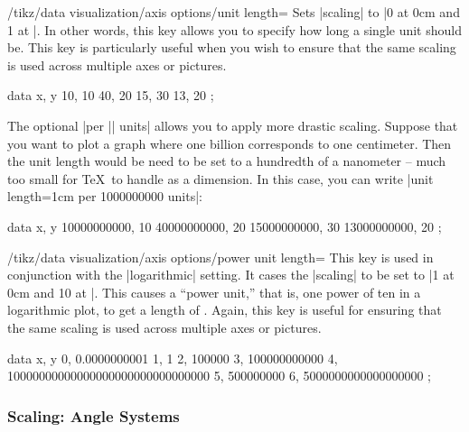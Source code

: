 \begin{key}{/tikz/data visualization/axis
    options/unit length=}
  Sets |scaling| to |0 at 0cm and 1 at |. In other
  words, this key allows you to specify how long a single unit should
  be. This key is particularly useful when you wish to ensure that the
  same scaling is used across multiple axes or pictures.  
\begin{codeexample}[]
\tikz \datavisualization [scientific axes,
                          all axes={ticks=few, unit length=1mm},
                          visualize as line]
    data {
      x, y
      10, 10
      40, 20
      15, 30
      13, 20
    };
\end{codeexample}
  The optional |per || units| allows you to apply more
  drastic scaling. Suppose that you want to plot a graph where one
  billion corresponds to one centimeter. Then the unit length would be
  need to be set to a hundredth of a nanometer -- much too small for
  \TeX\ to handle as a dimension. In this case, you can write
  |unit length=1cm per 1000000000 units|:
\begin{codeexample}[]
\tikz \datavisualization
  [scientific axes,
   x axis={unit length=1mm per 1000000000 units, ticks=few},
   visualize as line]
 data {
   x, y
   10000000000, 10
   40000000000, 20
   15000000000, 30
   13000000000, 20
 };
\end{codeexample}
\end{key}
\begin{key}{/tikz/data visualization/axis
    options/power unit length=}
  This key is used in conjunction with the |logarithmic| setting. It
  cases the |scaling| to be set to
  |1 at 0cm and 10 at |. This causes a ``power unit,''
  that is, one power of ten in a logarithmic plot, to get a length of
  . Again, this key is useful for ensuring that the
  same scaling is used across multiple axes or pictures.  
\begin{codeexample}[]
\tikz \datavisualization
  [scientific axes, 
   y axis={logarithmic, power unit length=1mm, grid},
   visualize as line]
 data {
   x, y
   0, 0.0000000001
   1, 1
   2, 100000
   3, 100000000000
   4, 10000000000000000000000000000000
   5, 500000000
   6, 5000000000000000000
 };
\end{codeexample}
\end{key}


\subsubsection{Scaling: Angle Systems}


